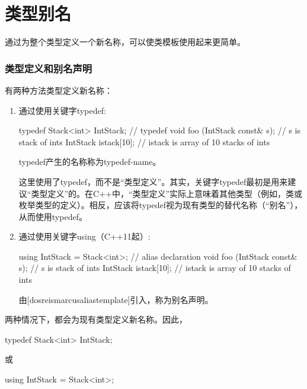 \section{类型别名}

通过为整个类型定义一个新名称，可以使类模板使用起来更简单。

\subsubsection{类型定义和别名声明}

有两种方法类型定义新名称：

\begin{enumerate}
\item
通过使用关键字typedef:

\begin{cpp}
typedef Stack<int> IntStack; // typedef
void foo (IntStack const& s); // s is stack of ints
IntStack istack[10]; // istack is array of 10 stacks of ints
\end{cpp}

typedef产生的名称称为typedef-name。

\begin{notice}
这里使用了typedef，而不是“类型定义”。其实，关键字typedef最初是用来建议“类型定义”的。在C++中，“类型定义”实际上意味着其他类型（例如，类或枚举类型的定义）。相反，应该将typedef视为现有类型的替代名称（“别名”），从而使用typedef。
\end{notice}

\item
通过使用关键字using（C++11起）:

\begin{cpp}
using IntStack = Stack<int>; // alias declaration
void foo (IntStack const& s); // s is stack of ints
IntStack istack[10]; // istack is array of 10 stacks of ints
\end{cpp}

由[dosreismarcusaliastemplate]引入，称为别名声明。

\end{enumerate}

两种情况下，都会为现有类型定义新名称。因此，

\begin{cpp}
typedef Stack<int> IntStack;
\end{cpp}

或

\begin{cpp}
using IntStack = Stack<int>;
\end{cpp}

